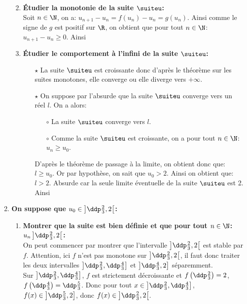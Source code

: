 \begin{correction}
\begin{enumerate}
\begin{enumerate}
\begin{itemize}
\end{itemize}
\item \textbf{\'Etudier la monotonie de la suite $\suiteu$:}\\
\noindent Soit $n\in\N$, on a: $u_{n+1}-u_n=f(u_n)-u_n=g(u_n)$. Ainsi comme le signe de $g$ est positif sur $\R$, on obtient que pour tout $n\in\N$: $u_{n+1}-u_n\geq 0$. Ainsi 
\item \textbf{\'Etudier le comportement \`{a} l'infini de la suite $\suiteu$:}
\begin{itemize}
\item[$\star$] La suite $\suiteu$ est croissante donc d'apr\`{e}s le th\'eor\`{e}me sur les suites monotones, elle converge ou elle diverge vers $+\infty$.
\item[$\star$] On suppose par l'absurde que la suite $\suiteu$ converge vers un r\'eel $l$. On a alors:
\begin{itemize}
\item[$\circ$] La suite $\suiteu$ converge vers $l$.
\item[$\circ$] Comme la suite $\suiteu$ est croissante, on a pour tout $n\in\N$: $u_n\geq u_0$.
\end{itemize}
D'apr\`{e}s le th\'eor\`{e}me de passage \`{a} la limite, on obtient donc que: $l\geq u_0$. Or par hypoth\`{e}se, on sait que $u_0>2$. Ainsi on obtient que: $l>2$. Absurde car la seule limite \'eventuelle de la suite $\suiteu$ est 2. Ainsi 
\end{itemize}
\end{enumerate}
\item \textbf{On suppose que $u_0\in\left\rbrack \ddp\frac{2}{3},2\right\lbrack $:}
\begin{enumerate}
\item \textbf{Montrer que la suite est bien d\'efinie et que pour tout $n\in\N$: $u_n\left\rbrack \ddp\frac{2}{3},2\right\lbrack$:}\\
\noindent On peut commencer par montrer que l'intervalle $\left\rbrack \ddp\frac{2}{3},2\right\lbrack$ est stable par $f$. Attention, ici $f$ n'est pas monotone sur $\left\rbrack \ddp\frac{2}{3},2\right\lbrack$, il faut donc traiter les deux intervalles $\left\rbrack \ddp\frac{2}{3},\ddp\frac{4}{3}\right\rbrack$ et $\left\rbrack \ddp\frac{4}{3}, 2\right\rbrack$ s\'eparemment.\\
Sur $\left\rbrack \ddp\frac{2}{3},\ddp\frac{4}{3}\right\rbrack$, $f$ est strictement d\'ecroissante et $f\left(\ddp\frac{2}{3}\right) = 2$, $f\left(\ddp\frac{4}{3}\right)=\ddp\frac{5}{3}$. Donc pour tout $x \in \left\rbrack \ddp\frac{2}{3},\ddp\frac{4}{3}\right\rbrack$, $f(x) \in \left\rbrack \ddp\frac{5}{3},2\right\rbrack$, donc $f(x) \in \left\rbrack \ddp\frac{2}{3},2\right\lbrack$.\\

\end{enumerate}
\end{enumerate}
\end{correction}
